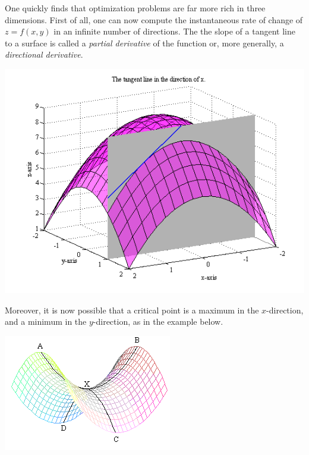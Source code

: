 \documentclass[12pt,letterpaper,reqno]{article}
\numberwithin{equation}{section}
\newcommand{\ti}[1]{\textit{#1}}
\begin{document}
One quickly finds that optimization problems are far more rich in three dimensions. First of all, one can now compute the instantaneous rate of change of $z=f(x,y)$ in an infinite number of directions. The the slope of a tangent line to a surface is called a  \ti{partial derivative} of the function or, more generally, a \ti{directional derivative}.
\begin{center}
	\includegraphics[scale=0.5]{figures_mvc/partial_derivative_2}
\end{center}
 Moreover, it is now possible that a critical point is a maximum in the $x$-direction, and a minimum in the $y$-direction, as in the example below.
\begin{center}
	\includegraphics[scale=0.5]{figures_mvc/saddle_point}
\end{center}
\end{document}
